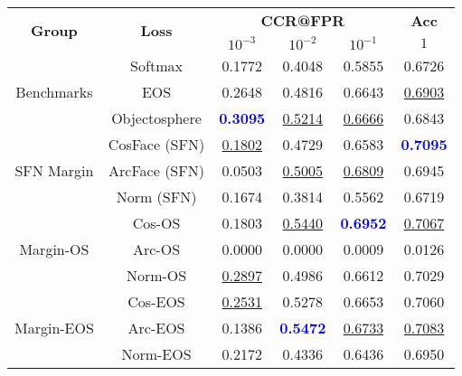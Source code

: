 \begin{tabularx}{.7\textwidth}{|c|c||ccc|c|}
\hline
\multirow{2}{*}{\bf Group} & \multirow{2}{*}{\bf Loss} & \multicolumn{3}{c|}{\bf CCR@FPR} & \bf {Acc} \\ \cline{3-6}
& &$10^{-3}$ & $10^{-2}$ & $10^{-1}$ & $1$\\\hline\hline
\multirow{3}{*}{Benchmarks} & Softmax & 0.1772 & 0.4048 & 0.5855 & 0.6726\\
 & EOS & 0.2648 & 0.4816 & 0.6643 & \underline {0.6903}\\
 & Objectosphere & \textcolor{blue}{\bf 0.3095} & \underline {0.5214} & \underline {0.6666} & 0.6843\\
\hline
\multirow{3}{*}{SFN Margin} & CosFace (SFN) & \underline {0.1802} & 0.4729 & 0.6583 & \textcolor{blue}{\bf 0.7095}\\
 & ArcFace (SFN) & 0.0503 & \underline {0.5005} & \underline {0.6809} & 0.6945\\
 & Norm (SFN) & 0.1674 & 0.3814 & 0.5562 & 0.6719\\
\hline
\multirow{3}{*}{Margin-OS} & Cos-OS & 0.1803 & \underline {0.5440} & \textcolor{blue}{\bf 0.6952} & \underline {0.7067}\\
 & Arc-OS & 0.0000 & 0.0000 & 0.0009 & 0.0126\\
 & Norm-OS & \underline {0.2897} & 0.4986 & 0.6612 & 0.7029\\
\hline
\multirow{3}{*}{Margin-EOS} & Cos-EOS & \underline {0.2531} & 0.5278 & 0.6653 & 0.7060\\
 & Arc-EOS & 0.1386 & \textcolor{blue}{\bf 0.5472} & \underline {0.6733} & \underline {0.7083}\\
 & Norm-EOS & 0.2172 & 0.4336 & 0.6436 & 0.6950\\
\hline
\end{tabularx}
